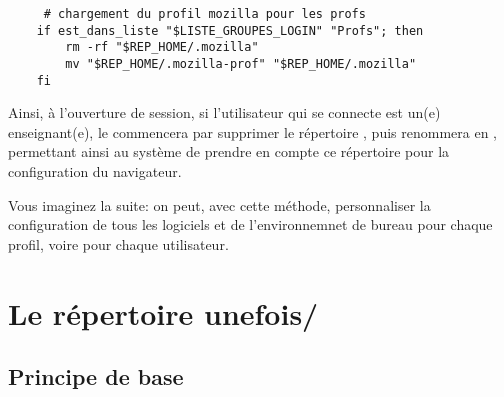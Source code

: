 \begin{lstlisting}
     # chargement du profil mozilla pour les profs
    if est_dans_liste "$LISTE_GROUPES_LOGIN" "Profs"; then
        rm -rf "$REP_HOME/.mozilla"
        mv "$REP_HOME/.mozilla-prof" "$REP_HOME/.mozilla"
    fi
\end{lstlisting}

Ainsi, à l'ouverture de session, si l'utilisateur qui se connecte est un(e) enseignant(e), 
le  commencera par supprimer le répertoire , 
puis renommera  en , permettant ainsi au 
système de prendre en compte ce répertoire pour la configuration du navigateur.

Vous imaginez la suite: on peut, avec cette méthode, personnaliser la configuration de 
tous les logiciels et de l'environnemnet de bureau pour chaque profil, voire pour chaque utilisateur.

\section{Le répertoire unefois/}
\label{unefois}

\subsection{Principe de base}

